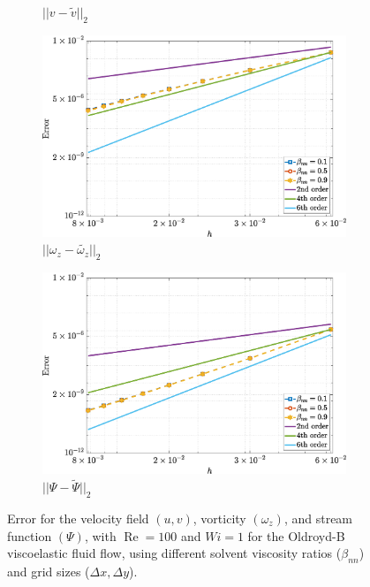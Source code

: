 \documentclass[preprint, 12pt]{elsarticle}
\begin{document}
\begin{figure}[H]
\begin{subfigure}[b]{.46\textwidth}
        \caption{$||v - \widetilde{v}||_{2}$}
        \label{error_v_2nd_Case1_oldorydb}
    \end{subfigure}
    \qquad
    \begin{subfigure}[b]{.46\textwidth}
        \includegraphics[width=\textwidth]{NormErr_2nd_Re_100_Wi_1_epsilon_0_xi_0_alphaG_0_Dt_1e-06_at_0.05_tipsim_1_MMS_12_Wz.eps}
        \caption{$||\omega_{z} - \widetilde{\omega_{z}}||_{2}$}
        \label{error_wz_2nd_Case1_oldorydb}
    \end{subfigure}
    \vspace{0.02cm}
    \qquad
    \begin{subfigure}[b]{.46\textwidth}
        \includegraphics[width=\textwidth]{NormErr_2nd_Re_100_Wi_1_epsilon_0_xi_0_alphaG_0_Dt_1e-06_at_0.05_tipsim_1_MMS_12_Psi.eps}
        \caption{$||\Psi - \widetilde{\Psi}||_{2}$}
        \label{error_psi_2nd_Case1_oldorydb}
    \end{subfigure}
    \vspace{0.02cm}
    \caption{Error for the velocity field $({u},{v})$, vorticity $({\omega_{z}})$, and stream function $({\Psi})$, with $\operatorname{Re}=100$ and $Wi=1$ for the Oldroyd-B viscoelastic fluid flow, using different solvent viscosity ratios ($\beta_{nn}$) and grid sizes ($\Delta x, \Delta y$).\label{fig_OldroydB_error_uvwzpsi}}
\end{figure}
\end{document}
